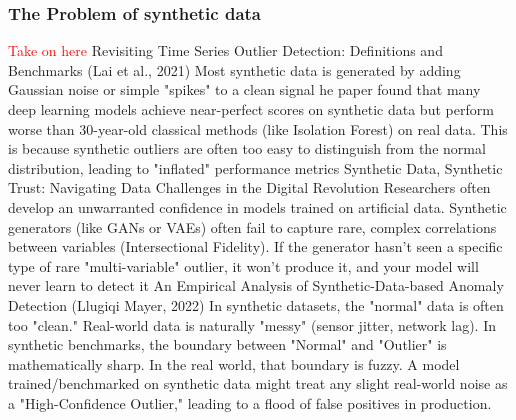 \subsubsection{The Problem of synthetic data}
\textcolor{red}{ Take on here }
    Revisiting Time Series Outlier Detection: Definitions and Benchmarks (Lai et al., 2021)
        Most synthetic data is generated by adding Gaussian noise or simple "spikes" to a clean signal
        he paper found that many deep learning models achieve near-perfect scores on synthetic data but perform worse than 30-year-old classical methods (like Isolation Forest) on real data. 
        This is because synthetic outliers are often too easy to distinguish from the normal distribution, leading to "inflated" performance metrics
    Synthetic Data, Synthetic Trust: Navigating Data Challenges in the Digital Revolution
        Researchers often develop an unwarranted confidence in models trained on artificial data.
        Synthetic generators (like GANs or VAEs) often fail to capture rare, complex correlations between variables (Intersectional Fidelity). 
        If the generator hasn't seen a specific type of rare "multi-variable" outlier, it won't produce it, and your model will never learn to detect it
    An Empirical Analysis of Synthetic-Data-based Anomaly Detection (Llugiqi  Mayer, 2022)
        In synthetic datasets, the "normal" data is often too "clean."
        Real-world data is naturally "messy" (sensor jitter, network lag). In synthetic benchmarks, the boundary between "Normal" and "Outlier" is mathematically sharp. 
        In the real world, that boundary is fuzzy.
        A model trained/benchmarked on synthetic data might treat any slight real-world noise as a "High-Confidence Outlier," leading to a flood of false positives in production.
  

